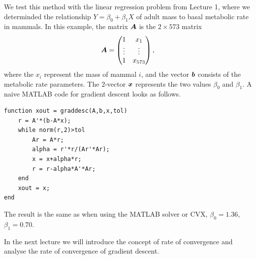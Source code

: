 \begin{example}
 We test this method with the linear regression problem from Lecture 1, where we determinded the relationship $Y=\beta_0+\beta_1X$ of adult mass to basal metabolic rate in mammals. In this example, the matrix $\bm{A}$ is the $2\times 573$ matrix
 \begin{equation*}
  \bm{A} = \begin{pmatrix}
             1 & x_1\\
             \vdots & \vdots\\
             1 & x_{573}
            \end{pmatrix},
            \end{equation*}
where the $x_i$ represent the mass of mammal $i$, and the vector $\bm{b}$ consists of the metabolic rate parameters. The $2$-vector $\bm{x}$ represents the two values $\beta_0$ and $\beta_1$. A naive MATLAB code for gradient descent looks as follows.
\begin{lstlisting}
function xout = graddesc(A,b,x,tol)
    r = A'*(b-A*x);
    while norm(r,2)>tol
        Ar = A*r;
        alpha = r'*r/(Ar'*Ar);
        x = x+alpha*r;
        r = r-alpha*A'*Ar;
    end
    xout = x;
end
\end{lstlisting}
The result is the same as when using the MATLAB solver or CVX,
$\beta_0 = 1.36$, $\beta_1 = 0.70$.
\end{example}


In the next lecture we will introduce the concept of rate of convergence and analyse the rate of convergence of gradient descent.

